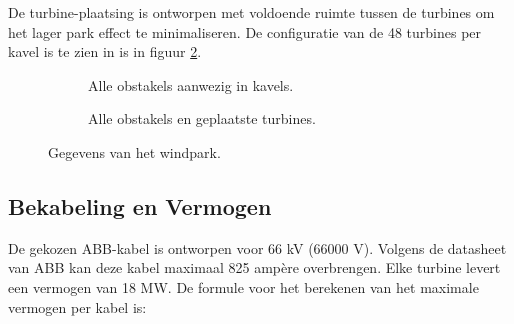 De turbine-plaatsing is ontworpen met voldoende ruimte tussen de turbines om het lager park effect te minimaliseren. De configuratie van de 48 turbines per kavel is te zien in is in figuur \ref{fig:windparkturbines}.
\begin{figure}[h]
    \centering
    \begin{subfigure}{0.5\textwidth}
        \centering
        \setlength{\fboxsep}{0pt}  %
    \colorbox{darkgray}{}
        \caption{Alle obstakels aanwezig in kavels.}
        \label{fig:windparkitems}
    \end{subfigure}%
    \begin{subfigure}{0.5\textwidth}
        \centering
        \setlength{\fboxsep}{0pt}  %
    \colorbox{darkgray}{}
        \caption{Alle obstakels en geplaatste turbines.}
        \label{fig:windparkturbines}
    \end{subfigure}
    \caption{Gegevens van het windpark.}
    \label{fig:windpark}
\end{figure}


\subsection{Bekabeling en Vermogen}
De gekozen ABB-kabel is ontworpen voor 66 kV (66000 V). Volgens de datasheet van ABB kan deze kabel maximaal 825 ampère overbrengen. Elke turbine levert een vermogen van 18 MW. De formule voor het berekenen van het maximale vermogen per kabel is:

